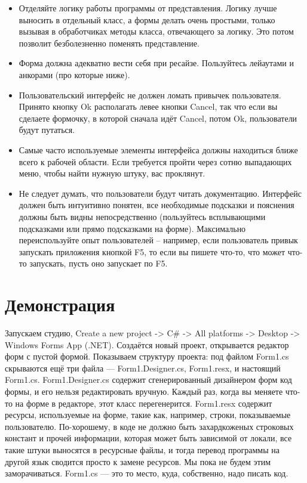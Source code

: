 \documentclass[a5paper]{article}
\begin{document}
\begin{itemize}
    \item Отделяйте логику работы программы от представления. Логику лучше выносить в отдельный класс, а формы делать очень простыми, только вызывая в обработчиках методы класса, отвечающего за логику. Это потом позволит безболезненно поменять представление.
    \item Форма должна адекватно вести себя при ресайзе. Пользуйтесь лейаутами и анкорами (про которые ниже).
    \item Пользовательский интерфейс не должен ломать привычек пользователя. Принято кнопку Ok располагать левее кнопки Cancel, так что если вы сделаете формочку, в которой сначала идёт Cancel, потом Ok, пользователи будут путаться. 
    \item Самые часто используемые элементы интерфейса должны находиться ближе всего к рабочей области. Если требуется пройти через сотню выпадающих меню, чтобы найти нужную штуку, вас проклянут.
    \item Не следует думать, что пользователи будут читать документацию. Интерфейс должен быть интуитивно понятен, все необходимые подсказки и пояснения должны быть видны непосредственно (пользуйтесь всплывающими подсказками или прямо подсказками на форме). Максимально переиспользуйте опыт пользователей – например, если пользователь привык запускать приложения кнопкой F5, то если вы пишете что-то, что может что-то запускать, пусть оно запускает по F5.
\end{itemize}

\section{Демонстрация}

Запускаем студию, Create a new project -> C\# -> All platforms -> Desktop -> Windows Forms App (.NET). Создаётся новый проект, открывается редактор форм с пустой формой. Показываем структуру проекта: под файлом Form1.cs скрываются ещё три файла --- Form1.Designer.cs, Form1.resx, и настоящий Form1.cs. Form1.Designer.cs содержит сгенерированный дизайнером форм код формы, и его нельзя редактировать вручную. Каждый раз, когда вы меняете что-то на форме в редакторе, этот класс перегенерится. Form1.resx содержит ресурсы, используемые на форме, такие как, например, строки, показываемые пользователю. По-хорошему, в коде не должно быть захардкоженых строковых констант и прочей информации, которая может быть зависимой от локали, все такие штуки выносятся в ресурсные файлы, и тогда перевод программы на другой язык сводится просто к замене ресурсов. Мы пока не будем этим заморачиваться. Form1.cs --- это то место, куда, собственно, надо писать код.
\end{document}
